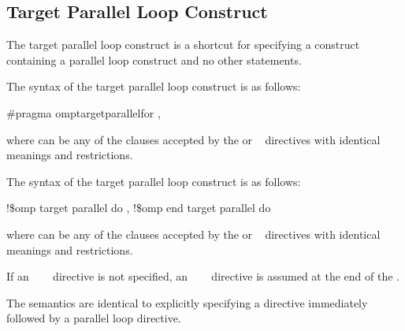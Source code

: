 
\subsection{Target Parallel Loop Construct}
\label{subsec:Target Parallel Loop Construct}
\summary
The target parallel loop construct is a shortcut for specifying a  
construct containing a parallel loop construct and no other statements.

\syntax
\ccppspecificstart
The syntax of the target parallel loop construct is as follows:

\begin{boxedcode}
\#pragma omp\plc{ }target\plc{ }parallel\plc{ }for \plc{[clause[ [},\plc{] clause] ... ]}
\end{boxedcode}

where  can be any of the clauses accepted by the  or
~ directives with identical meanings and restrictions.
\ccppspecificend

\begin{samepage}
\fortranspecificstart
The syntax of the target parallel loop construct is as follows:

\begin{boxedcode}
!\$omp target parallel do \plc{[clause[ [},\plc{] clause] ... ]}
\plc{[}!\$omp end target parallel do\plc{]}
\end{boxedcode}
\end{samepage}

where  can be any of the clauses accepted by the  or 
~ directives with identical meanings and restrictions.

If an ~~~ directive is not specified, an 
~~~ directive is assumed at the end of 
the .
\fortranspecificend

\descr
The semantics are identical to explicitly specifying a  directive
immediately followed by a parallel loop directive.


